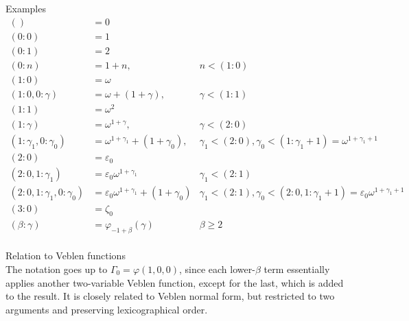 \documentclass{article}
\newcommand{\w}{\omega}
\newcommand{\e}{\varepsilon}
\begin{document}


Examples \\
\begin{align*}
  () &= 0 \\
  (0: 0) &= 1 \\
  (0: 1) &= 2 \\
  (0: n) &= 1+n, & n < (1: 0) \\
  (1: 0) &= \w \\
  (1: 0, 0: \gamma) &= \w+(1+\gamma), & \gamma < (1: 1) \\
  (1: 1) &= \w^2 \\
  (1: \gamma) &= \w^{1+\gamma}, & \gamma < (2: 0) \\
  (1: \gamma_1, 0: \gamma_0) &= \w^{1+\gamma_1}+(1+\gamma_0),
  & \gamma_1 < (2: 0), \gamma_0 < (1: \gamma_1+1) = \w^{1+\gamma_1+1} \\
  (2: 0) &= \e_0 \\
  (2: 0, 1: \gamma_1) &= \e_0\w^{1+\gamma_1}
  & \gamma_1 < (2: 1) \\
  (2: 0, 1: \gamma_1, 0: \gamma_0) &= \e_0\w^{1+\gamma_1}+(1+\gamma_0)
  & \gamma_1 < (2: 1), \gamma_0 < (2: 0, 1: \gamma_1+1) = \e_0\w^{1+\gamma_1+1} \\
  (3: 0) &= \zeta_0 \\
  (\beta: \gamma) &= \varphi_{-1+\beta}(\gamma) & \beta \geq 2
\end{align*} \\

Relation to Veblen functions \\
The notation goes up to $\Gamma_0=\varphi(1, 0, 0)$,
since each lower-$\beta$ term essentially applies
another two-variable Veblen function,
except for the last, which is added to the result.
It is closely related to Veblen normal form,
but restricted to two arguments
and preserving lexicographical order.
\end{document}
